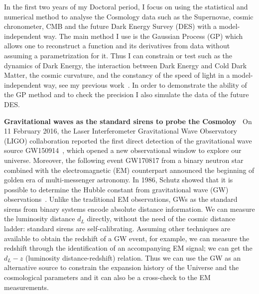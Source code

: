 \documentclass[11pt,letterpaper,sans]{moderncv}   %
\begin{document}
\vspace{2mm}
\noindent
In the first two years of my Doctoral period, I focus on using the statistical and numerical method to analyse the Cosmology data such as the Supernovae, cosmic chronometer, CMB and the future Dark Energy Survey (DES) with a model-independent way. The main method I use is the Gaussian Process (GP) which allows one to reconstruct a function and its derivatives from data without assuming a parametrization for it.
Thus I can constrain or test such as the dynamics of Dark Energy, the interaction between Dark Energy and Cold Dark Matter, the cosmic curvature, and the constancy of the speed of light in a model-independent way, see my previous work~\cite{Cai:2015zoa,Cai:2015pia,Cai:2016vmn}. In order to demonstrate the ability of the GP method and to check the precision I also simulate the data of the future DES.

\vspace{2mm}
\noindent
\textcolor{color1}{\textbf{Gravitational waves as the standard sirens to probe the Cosmoloy~\cite{Cai:2016sby,Cai:2017yww,Yang:2017bkv,Cai:2017aea}}} On 11 February 2016, the Laser Interferometer Gravitational Wave Observatory (LIGO) collaboration reported the first direct detection of the gravitational wave source GW150914~\cite{Abbott:2016blz}, which opened a new observational window to explore our universe. Moreover, the following event GW170817 from a binary neutron star combined with the electromagnetic (EM) counterpart announced the beginning of golden era of multi-messenger astronomy. In 1986, Schutz showed that it is possible to determine the Hubble constant from gravitational wave (GW) observations~\cite{Schutz:1986gp}.
Unlike the traditional EM observations, GWs as the standard sirens from binary systems encode absolute distance information. We can measure the luminosity distance $d_L$ directly, without the need of the cosmic distance ladder: standard sirens are self-calibrating. Assuming other techniques are available to obtain the redshift  of a GW event, for example, we can measure the redshift through the identification of an accompanying EM signal; we can get the $d_L-z$ (luminosity distance-redshift) relation. Thus we can use the GW as an alternative source to constrain the expansion history of the Universe and the cosmological parameters and it can also be a cross-check to the EM measurements.
\end{document}

